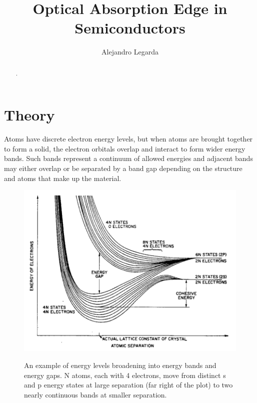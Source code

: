 \documentclass{article}
\title{Optical Absorption Edge in Semiconductors}
\author{Alejandro Legarda}
\begin{document}
\raggedright
\maketitle

\begin{abstract}
.
\end{abstract}


\tableofcontents
\newpage

\section{Theory}

Atoms have discrete electron energy levels, but when atoms are brought together to form a solid, the electron orbitals overlap and interact to form wider energy bands. Such bands represent a continuum of allowed energies and adjacent bands may either overlap or be separated by a band gap depending on the structure and atoms that make up the material.

\hspace{.25cm}

\begin{figure}[!htb]
	\centering
	\includegraphics[scale=.5]{plots/fig_1.png}
 	\label{bands}
	\caption{An example of energy levels broadening into energy bands and energy gaps. N atoms, each with 4 electrons, move from distinct s and p energy states at large separation (far right of the plot) to two nearly continuous bands at smaller separation.}
\end{figure}

\hspace{.25cm}
\end{document}
